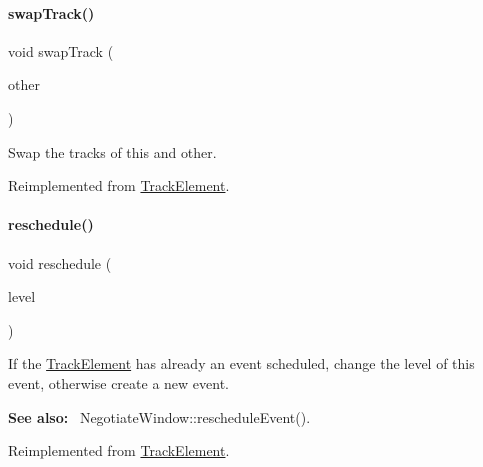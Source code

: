 \mbox{\label{classKite_1_1TrackSegment_acc245ce084989d1c34816d0e61b9d510}} 
\paragraph{\texorpdfstring{swap\+Track()}{swapTrack()}}
{\footnotesize\ttfamily void swap\+Track (\begin{DoxyParamCaption}\item[{\hyperlink{classKite_1_1TrackElement}{Track\+Element} $\ast$}]{other }\end{DoxyParamCaption})\hspace{0.3cm}{\ttfamily [virtual]}}

Swap the tracks of {\ttfamily this} and {\ttfamily other}. 

Reimplemented from \hyperlink{classKite_1_1TrackElement_acc245ce084989d1c34816d0e61b9d510}{Track\+Element}.

\mbox{\label{classKite_1_1TrackSegment_a0ffe603ec7d46f21f5e56ccbe84c03fb}} 
\paragraph{\texorpdfstring{reschedule()}{reschedule()}}
{\footnotesize\ttfamily void reschedule (\begin{DoxyParamCaption}\item[{unsigned int}]{level }\end{DoxyParamCaption})\hspace{0.3cm}{\ttfamily [virtual]}}

If the \hyperlink{classKite_1_1TrackElement}{Track\+Element} has already an event scheduled, change the level of this event, otherwise create a new event.

{\bfseries See also\+:}~ Negotiate\+Window\+::reschedule\+Event(). 

Reimplemented from \hyperlink{classKite_1_1TrackElement_a0ffe603ec7d46f21f5e56ccbe84c03fb}{Track\+Element}.

\mbox{\label{classKite_1_1TrackSegment_ac295bade8aee589f6718dfa79edc2a34}} 

